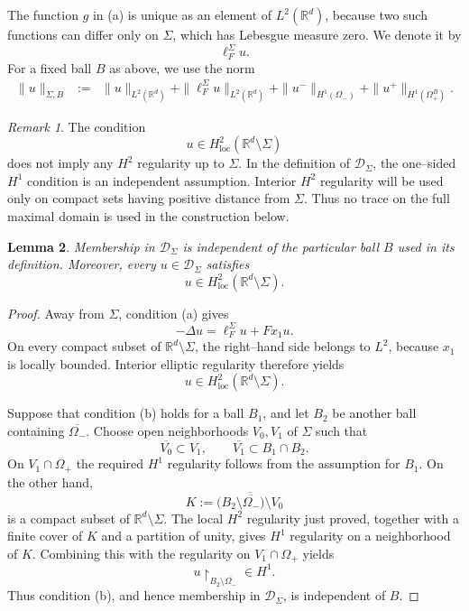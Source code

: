 \documentclass[a4paper,11pt]{article}
\numberwithin{equation}{section}
\newtheorem{lem}{Lemma}[section]
\theoremstyle{remark}
\newtheorem{rem}[lem]{Remark}
\theoremstyle{definition}
\theoremstyle{remark}
\begin{document}
The function $g$ in (a) is unique as an element of $L^2(\mathbb R^d)$, because two such functions can differ only on $\Sigma$, which has Lebesgue measure zero.
We denote it by
$$
\ell_F^\Sigma u.
$$
For a fixed ball $B$ as above, we use the norm
\begin{eqnarray*}
\|u\|_{\Sigma,B}
&:=&
\|u\|_{L^2(\mathbb R^d)}
+\|\ell_F^\Sigma u\|_{L^2(\mathbb R^d)}
+\|u^-\|_{H^1(\Omega_-)}
+\|u^+\|_{H^1(\Omega_+^B)}.
\end{eqnarray*}

\begin{rem}\label{rem:no-boundary-H2}
The condition
$$
u\in H^2_{\mathrm{loc}}(\mathbb R^d\setminus\Sigma)
$$
does not imply any $H^2$ regularity up to $\Sigma$.
In the definition of $\mathcal D_\Sigma$, the one--sided $H^1$ condition is an
independent assumption.
Interior $H^2$ regularity will be used only on compact sets having positive
distance from $\Sigma$.
Thus no trace on the full maximal domain is used in the construction below.
\end{rem}

\begin{lem}\label{lem:transmission-locality}
Membership in $\mathcal D_\Sigma$ is independent of the particular ball $B$ used in its definition.
Moreover, every $u\in\mathcal D_\Sigma$ satisfies
$$
u\in H^2_{\mathrm{loc}}(\mathbb R^d\setminus\Sigma).
$$
\end{lem}

\begin{proof}
Away from $\Sigma$, condition (a) gives
$$
-\Delta u=\ell_F^\Sigma u+Fx_1u.
$$
On every compact subset of $\mathbb R^d\setminus\Sigma$, the right--hand side belongs to $L^2$, because $x_1$ is locally bounded.
Interior elliptic regularity therefore yields
$$
u\in H^2_{\mathrm{loc}}(\mathbb R^d\setminus\Sigma).
$$

Suppose that condition (b) holds for a ball $B_1$, and let $B_2$ be another ball containing $\overline{\Omega_-}$.
Choose open neighborhoods $V_0,V_1$ of $\Sigma$ such that
$$
\overline{V_0}\subset V_1,
\qquad
\overline{V_1}\subset B_1\cap B_2.
$$
On $V_1\cap\Omega_+$ the required $H^1$ regularity follows from the assumption for $B_1$.
On the other hand,
$$
K:=\overline{\bigl(B_2\setminus\overline{\Omega_-}\bigr)
\setminus V_0}
$$
is a compact subset of $\mathbb R^d\setminus\Sigma$.
The local $H^2$ regularity just proved, together with a finite cover of $K$ and a partition of unity, gives $H^1$ regularity on a neighborhood of $K$.
Combining this with the regularity on $V_1\cap\Omega_+$ yields
$$
u\upharpoonright_{B_2\setminus\overline{\Omega_-}}\in H^1.
$$
Thus condition (b), and hence membership in $\mathcal D_\Sigma$, is independent of $B$.
\end{proof}
\end{document}
